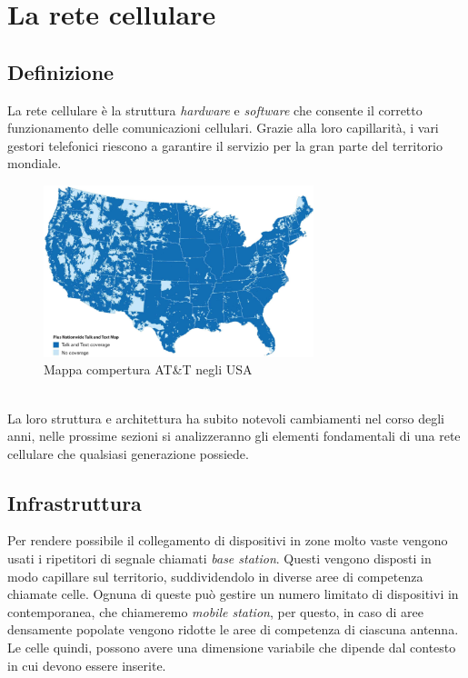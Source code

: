 \section{La rete cellulare}
\subsection{Definizione}
La rete cellulare è la struttura \textit{hardware} e \textit{software} che consente il corretto
funzionamento delle comunicazioni cellulari.
Grazie alla loro capillarità, i vari gestori telefonici riescono a garantire il servizio per la 
gran parte del territorio mondiale.
\begin{figure}[h]
    \centering
    \includegraphics[width=0.7\textwidth]{images/att-coverage.png}
    \caption{Mappa compertura AT\&T negli USA}
\end{figure}\\
La loro struttura e architettura ha subito notevoli cambiamenti nel corso degli anni, nelle prossime
sezioni si analizzeranno gli elementi fondamentali di una rete cellulare che qualsiasi generazione possiede.
\subsection{Infrastruttura}
Per rendere possibile il collegamento di dispositivi in zone molto vaste vengono usati i ripetitori di segnale chiamati \textit{base station}. 
Questi vengono disposti in modo capillare sul territorio, suddividendolo in diverse aree di competenza chiamate celle. Ognuna di queste può gestire
un numero limitato di dispositivi in contemporanea, che chiameremo \textit{mobile station}, per questo, in caso di aree densamente popolate vengono 
ridotte le aree di competenza di ciascuna antenna. Le celle quindi, possono avere una dimensione variabile che dipende dal contesto in cui devono essere inserite.

